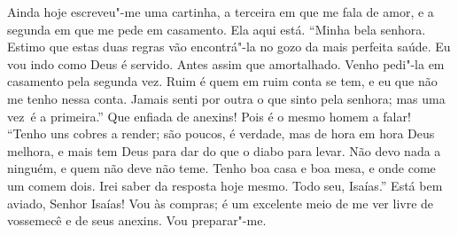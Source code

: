 \begin{linenumbers}
Ainda hoje escreveu"-me uma cartinha, a terceira em que me fala de amor, e a
segunda em que me pede em casamento. 
Ela aqui está.  “Minha bela senhora. Estimo que estas duas regras vão
encontrá"-la no gozo da mais perfeita saúde. Eu vou indo como Deus é servido.
Antes assim que amortalhado. Venho pedi"-la em casamento pela segunda vez. Ruim é
quem em ruim conta se tem, e eu que não me tenho nessa conta. Jamais senti por
outra o que sinto pela senhora; mas uma \mbox{vez é} a primeira.” 
Que enfiada de anexins! Pois é o mesmo homem a falar!  “Tenho uns cobres a render; são poucos, é verdade, mas de hora em hora
Deus melhora, e mais tem Deus para dar do que o diabo para levar. Não devo nada a ninguém, e quem não
deve não teme. Tenho boa casa e boa mesa, e onde come um comem dois. Irei saber
da resposta hoje mesmo. Todo seu,
Isaías.”  Está bem aviado, Senhor Isaías!  Vou às
compras; é um excelente meio de me ver livre de vossemecê e de seus
anexins. Vou preparar"-me. 


\stagedir{\textsc{[Isaías]}}


\end{linenumbers}
